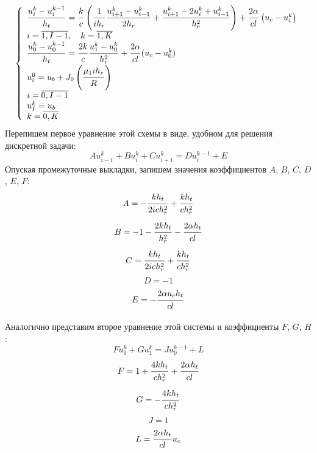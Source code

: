 \documentclass[a4paper,12pt,russian, fleqn]{extreport}
\begin{document}
	\begin{equation}\label{ImplicitScheme}
		\left\{\begin{array}{l}
			\dfrac{\strut u_i^{k}-u_i^{k-1}}{\strut h_t} = \dfrac{\strut k}{\strut c}\left(\dfrac{\strut 1}{\strut ih_r}\dfrac{\strut u_{i+1}^k - u_{i-1}^k}{\strut 2h_r} +\dfrac{\strut u_{i+1}^k - 2u_i^k + u_{i-1}^k}{\strut h^2_r}\right) + \dfrac{\strut 2\alpha}{\strut cl}\left (u_c - u_i^k \right) \\
			i = \overline{1,I-1}, \quad k = \overline{1,K}	 \\
			\dfrac{\strut u_0^{k}-u_0^{k-1}}{\strut h_t} = \dfrac{\strut 2k}{\strut c}\dfrac{\strut u_1^k-u_0^k}{\strut h_r^2} + \dfrac{\strut 2\alpha}{\strut cl}(u_c-u_0^k) \\
			u_i^0 = u_b + J_0\left( \dfrac{\strut \mu_1 ih_r}{\strut R} \right) \\
			i = \overline{0, I-1} \\
			u_I^k = u_b \\
			k = \overline{0,K}
		\end{array}\right.
	\end{equation}
	Перепишем первое уравнение этой схемы в виде, удобном для решения дискретной задачи:
	\begin{equation*}
		Au^k_{i-1} + Bu^k_i + Cu^k_{i+1} = Du_i^{k-1} + E
	\end{equation*}
	Опуская промежуточные выкладки, запишем значения коэффициентов $A$, $B$, $C$, $D$, $E$, $F$:
	\begin{equation*}
		A = -\dfrac{\strut k h_t}{\strut 2ich_r^2} + \dfrac{\strut k h_t}{\strut c h_r^2}
	\end{equation*}
	\begin{equation*}
		B = - 1 - \dfrac{\strut 2 k h_t}{\strut h_r^2} - \dfrac{\strut 2 \alpha h_t}{\strut cl}
	\end{equation*}
	\begin{equation*}
		C = \dfrac{\strut k h_t}{\strut 2ich_r^2} + \dfrac{\strut k h_t}{\strut c h_r^2}
	\end{equation*}
	\begin{equation*}
		D = -1
	\end{equation*}
	\begin{equation*}
		E = - \dfrac{\strut 2\alpha u_c h_t}{\strut cl}
	\end{equation*}
	
	Аналогично представим второе уравнение этой системы и коэффициенты $F$, $G$, $H$:
	\begin{equation*}
		Fu_0^k + Gu_1^{k} = Ju_0^{k-1} + L
	\end{equation*}
	\begin{equation*}
		F = 1 + \dfrac{\strut 4kh_t}{\strut ch_r^2} + \dfrac{\strut 2\alpha h_t}{\strut cl}
	\end{equation*}
	\begin{equation*}
		G = -\dfrac{\strut 4kh_t}{\strut ch_r^2}
	\end{equation*}
	\begin{equation*}
		J = 1
	\end{equation*}
	\begin{equation*}
		L = \dfrac{\strut 2\alpha h_t}{\strut cl}u_c
	\end{equation*}
\end{document}
